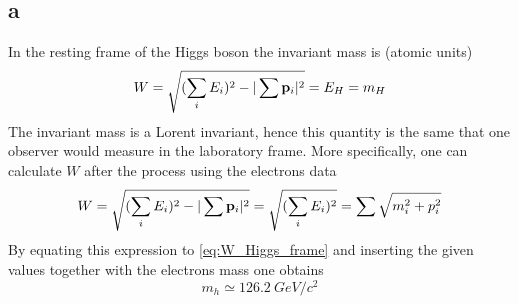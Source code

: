 \subsection*{a}
In the resting frame of the Higgs boson the invariant mass is (atomic units)
\begin{equation}
    W = \sqrt{(\sum_i E_i)^2 - |\sum \mathbf{p}_i|^2} = E_H = m_H
    \label{eq:W_Higgs_frame}
\end{equation}
The invariant mass is a Lorent invariant, hence this quantity is the same that one observer would measure in the laboratory frame. 
More specifically, one can calculate $W$ after the process using the electrons data
\begin{equation*}
    W = \sqrt{(\sum_i E_i)^2 - |\sum \mathbf{p}_i|^2} = \sqrt{(\sum_i E_i)^2} = \sum \sqrt{m_i^2 + p_i^2}
\end{equation*}
By equating this expression to \ref{eq:W_Higgs_frame} and inserting the given values together with the electrons mass one obtains
\begin{equation*}
    m_h \simeq 126.2~GeV/c^2
\end{equation*}


